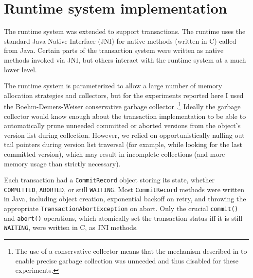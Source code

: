 \section{Runtime system implementation}
The \flex runtime system was extended to support transactions.  The
runtime uses the standard Java Native Interface (JNI) \cite{JNI} for
native methods (written in C) called from Java.  Certain parts of the
transaction system were written as native methods invoked via JNI, but
others interact with the runtime system at a much lower level.
  
The runtime system is parameterized to allow a large number of memory
allocation strategies and collectors, but for the experiments reported
here I used the Boehm-Demers-Weiser conservative garbage collector
\cite{BoehmDeWe91}.\footnote{The use of a conservative collector means
  that the mechanism described in  to enable
  precise garbage collection was unneeded and thus disabled for these
  experiments.} 
Ideally the garbage collector would know enough about the transaction
implementation to be able to automatically prune unneeded committed or
aborted versions from the object's version list during collection.
However, we relied on opportunistically nulling out tail pointers
during version list traversal (for example, while looking for the
last committed version), which may result in incomplete collections
(and more memory usage than strictly necessary).

Each transaction had a \texttt{CommitRecord} object storing its state,
whether \texttt{COMMITTED}, \texttt{ABORTED}, or still
\texttt{WAITING}.  Most \texttt{CommitRecord} methods were written in
Java, including object creation, exponential backoff on retry, and
throwing the appropriate \texttt{TransactionAbortException} on abort.
Only the crucial \texttt{commit()} and \texttt{abort()} operations,
which atomically set the transaction status iff it is still
\texttt{WAITING}, were written in C, as JNI methods.

